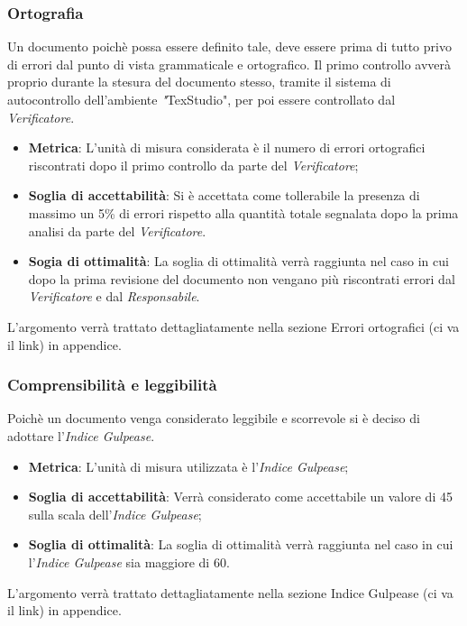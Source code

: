 \subsubsection{Ortografia}
Un documento poichè possa essere definito tale, deve essere prima di tutto privo di errori dal punto di vista grammaticale e ortografico. 
Il primo controllo avverà proprio durante la stesura del documento stesso, tramite il sistema di autocontrollo dell'ambiente  \textit"{TexStudio}", per poi essere controllato dal  \textit{Verificatore}.
\begin{itemize}
	\item \textbf{Metrica}: L'unità di misura considerata è il numero di errori ortografici riscontrati dopo il primo controllo da parte del \textit{Verificatore};
	\item \textbf{Soglia di accettabilità}: Si è accettata come tollerabile la presenza di massimo un 5\% di errori rispetto alla quantità totale segnalata dopo la prima analisi da parte del \textit{Verificatore}.
	\item \textbf{Sogia di ottimalità}: La soglia di ottimalità verrà raggiunta nel caso in cui dopo la prima revisione del documento non vengano più riscontrati errori dal \textit{Verificatore} e dal \textit{Responsabile}.
\end{itemize}
L'argomento verrà trattato dettagliatamente nella sezione Errori ortografici (ci va il link) in appendice.
\subsubsection{Comprensibilità e leggibilità}
Poichè un documento venga considerato leggibile e scorrevole si è deciso di adottare l'\textit{Indice Gulpease}. 
\begin{itemize}
	\item \textbf{Metrica}: L'unità di misura utilizzata è l'\textit{Indice Gulpease};
	\item \textbf{Soglia di accettabilità}: Verrà considerato come accettabile un valore di 45 sulla scala dell'\textit{Indice Gulpease};
	\item \textbf{Soglia di ottimalità}: La soglia di ottimalità verrà raggiunta nel caso in cui l'\textit{Indice Gulpease} sia maggiore di 60.
\end{itemize}
L'argomento verrà trattato dettagliatamente nella sezione Indice Gulpease (ci va il link) in appendice.
